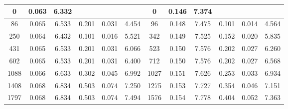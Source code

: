 \begin{table*}[]
\begin{tabular}{|cccccc|cccccc|}
        \multicolumn{1}{|c|}{0} & \multicolumn{1}{c|}{0.063} & \multicolumn{1}{c|}{6.332} & \multicolumn{1}{c|}{} & \multicolumn{1}{c|}{} &  & \multicolumn{1}{c|}{0} & \multicolumn{1}{c|}{0.146} & \multicolumn{1}{c|}{7.374} & \multicolumn{1}{c|}{} & \multicolumn{1}{c|}{} &  \\ \hline
        \multicolumn{1}{|c|}{86} & \multicolumn{1}{c|}{0.065} & \multicolumn{1}{c|}{6.533} & \multicolumn{1}{c|}{0.201} & \multicolumn{1}{c|}{0.031} & 4.454 & \multicolumn{1}{c|}{96} & \multicolumn{1}{c|}{0.148} & \multicolumn{1}{c|}{7.475} & \multicolumn{1}{c|}{0.101} & \multicolumn{1}{c|}{0.014} & 4.564 \\ \hline
        \multicolumn{1}{|c|}{250} & \multicolumn{1}{c|}{0.064} & \multicolumn{1}{c|}{6.432} & \multicolumn{1}{c|}{0.101} & \multicolumn{1}{c|}{0.016} & 5.521 & \multicolumn{1}{c|}{342} & \multicolumn{1}{c|}{0.149} & \multicolumn{1}{c|}{7.525} & \multicolumn{1}{c|}{0.152} & \multicolumn{1}{c|}{0.020} & 5.835 \\ \hline
        \multicolumn{1}{|c|}{431} & \multicolumn{1}{c|}{0.065} & \multicolumn{1}{c|}{6.533} & \multicolumn{1}{c|}{0.201} & \multicolumn{1}{c|}{0.031} & 6.066 & \multicolumn{1}{c|}{523} & \multicolumn{1}{c|}{0.150} & \multicolumn{1}{c|}{7.576} & \multicolumn{1}{c|}{0.202} & \multicolumn{1}{c|}{0.027} & 6.260 \\ \hline
        \multicolumn{1}{|c|}{602} & \multicolumn{1}{c|}{0.065} & \multicolumn{1}{c|}{6.533} & \multicolumn{1}{c|}{0.201} & \multicolumn{1}{c|}{0.031} & 6.400 & \multicolumn{1}{c|}{712} & \multicolumn{1}{c|}{0.150} & \multicolumn{1}{c|}{7.576} & \multicolumn{1}{c|}{0.202} & \multicolumn{1}{c|}{0.027} & 6.568 \\ \hline
        \multicolumn{1}{|c|}{1088} & \multicolumn{1}{c|}{0.066} & \multicolumn{1}{c|}{6.633} & \multicolumn{1}{c|}{0.302} & \multicolumn{1}{c|}{0.045} & 6.992 & \multicolumn{1}{c|}{1027} & \multicolumn{1}{c|}{0.151} & \multicolumn{1}{c|}{7.626} & \multicolumn{1}{c|}{0.253} & \multicolumn{1}{c|}{0.033} & 6.934 \\ \hline
        \multicolumn{1}{|c|}{1408} & \multicolumn{1}{c|}{0.068} & \multicolumn{1}{c|}{6.834} & \multicolumn{1}{c|}{0.503} & \multicolumn{1}{c|}{0.074} & 7.250 & \multicolumn{1}{c|}{1275} & \multicolumn{1}{c|}{0.153} & \multicolumn{1}{c|}{7.727} & \multicolumn{1}{c|}{0.354} & \multicolumn{1}{c|}{0.046} & 7.151 \\ \hline
        \multicolumn{1}{|c|}{1797} & \multicolumn{1}{c|}{0.068} & \multicolumn{1}{c|}{6.834} & \multicolumn{1}{c|}{0.503} & \multicolumn{1}{c|}{0.074} & 7.494 & \multicolumn{1}{c|}{1576} & \multicolumn{1}{c|}{0.154} & \multicolumn{1}{c|}{7.778} & \multicolumn{1}{c|}{0.404} & \multicolumn{1}{c|}{0.052} & 7.363 \\ \hline

\end{tabular}
\end{table*}
